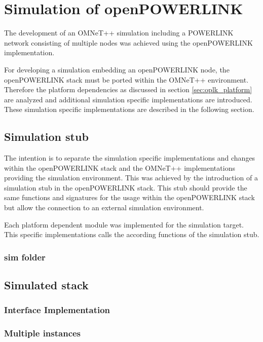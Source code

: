\chapter{Simulation of openPOWERLINK}
\label{cha:porting}
The development of an OMNeT++ simulation including a POWERLINK network consisting of multiple nodes was achieved using the openPOWERLINK implementation.

For developing a simulation embedding an openPOWERLINK node, the openPOWERLINK stack must be ported within the OMNeT++ environment.
Therefore the platform dependencies as discussed in section \ref{sec:oplk_platform} are analyzed and additional simulation specific implementations are introduced.
These simulation specific implementations are described in the following section.

\section{Simulation stub}
\label{sec:porting_simstub}

The intention is to separate the simulation specific implementations and changes within the openPOWERLINK stack and the OMNeT++ implementations providing the simulation environment.
This was achieved by the introduction of a simulation stub in the openPOWERLINK stack.
This stub should provide the same functions and signatures for the usage within the openPOWERLINK stack but allow the connection to an external simulation environment.


Each platform dependent module was implemented for the simulation target.
This specific implementations calls the according functions of the simulation stub.


\subsection{sim folder}
\label{sec:porting_simstub_sim}

\section{Simulated stack}
\label{sec:porting_stack}

\subsection{Interface Implementation}
\label{sec:porting_stack_interface}

\subsection{Multiple instances}
\label{sec:porting_stack_multiinstance}

